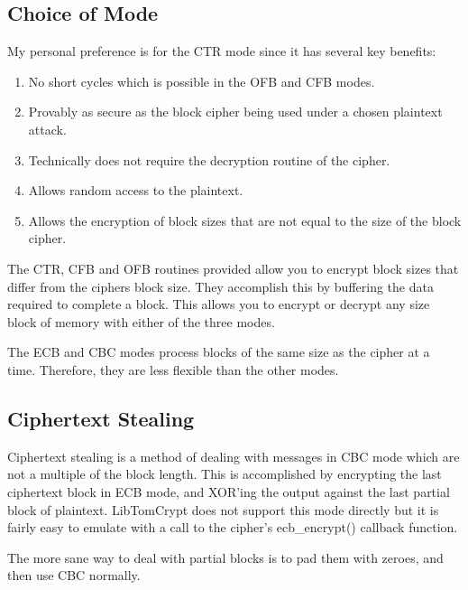 \documentclass[synpaper]{book}
\begin{document}
\subsection{Choice of Mode}
My personal preference is for the CTR mode since it has several key benefits:
\begin{enumerate}
   \item No short cycles which is possible in the OFB and CFB modes.
   \item Provably as secure as the block cipher being used under a chosen plaintext attack.
   \item Technically does not require the decryption routine of the cipher.
   \item Allows random access to the plaintext.
   \item Allows the encryption of block sizes that are not equal to the size of the block cipher.
\end{enumerate}
The CTR, CFB and OFB routines provided allow you to encrypt block sizes that differ from the ciphers block size.  They 
accomplish this by buffering the data required to complete a block.  This allows you to encrypt or decrypt any size 
block of memory with either of the three modes.

The ECB and CBC modes process blocks of the same size as the cipher at a time.  Therefore, they are less flexible than the
other modes.

\subsection{Ciphertext Stealing}
Ciphertext stealing is a method of dealing with messages in CBC mode which are not a multiple of the block length.  This is accomplished
by encrypting the last ciphertext block in ECB mode, and XOR'ing the output against the last partial block of plaintext.  LibTomCrypt does not
support this mode directly but it is fairly easy to emulate with a call to the cipher's ecb\_encrypt() callback function.  

The more sane way to deal with partial blocks is to pad them with zeroes, and then use CBC normally.  
\end{document}
